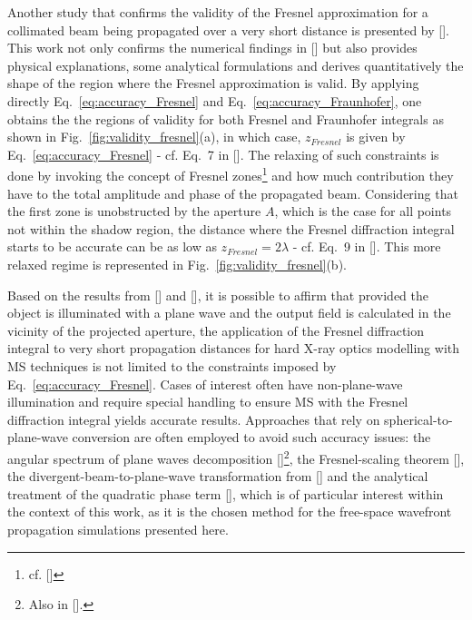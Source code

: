 \begin{refsection}
Another study that confirms the validity of the Fresnel approximation for a collimated beam being propagated over a very short distance is presented by [\cite{Rees87}]. This work not only confirms the numerical findings in [\cite{Southwell1981}] but also provides physical explanations, some analytical formulations and derives quantitatively the shape of the region where the Fresnel approximation is valid. By applying directly Eq.~\ref{eq:accuracy_Fresnel} and  Eq.~\ref{eq:accuracy_Fraunhofer}, one obtains the the regions of validity for both Fresnel and Fraunhofer integrals as shown in Fig.~\ref{fig:validity_fresnel}(a), in which case, $z_{Fresnel}$ is given by Eq.~\ref{eq:accuracy_Fresnel} - cf. Eq.~7 in [\cite{Rees87}]. The relaxing of such constraints is done by invoking the concept of Fresnel zones\footnote{cf. [\cite[\textit{§10.3.1}]{Hetch2017}]} and how much contribution they have to the total amplitude and phase of the propagated beam. Considering that the first zone is unobstructed by the aperture $A$, which is the case for all points not within the shadow region, the distance where the Fresnel diffraction integral starts to be accurate can be as low as $z_{Fresnel}=2\lambda$ - cf. Eq.~9 in [\cite{Rees87}]. This more relaxed regime is represented in Fig.~\ref{fig:validity_fresnel}(b).

Based on the results from [\cite{Southwell1981}] and [\cite{Rees87}], it is possible to affirm that provided the object is illuminated with a plane wave and the output field is calculated in the vicinity of the projected aperture, the application of the Fresnel diffraction integral to very short propagation distances for hard X-ray optics modelling with MS techniques is not limited to the constraints imposed by Eq.~\ref{eq:accuracy_Fresnel}. Cases of interest often have non-plane-wave illumination and require special handling to ensure MS with the Fresnel diffraction integral yields accurate results. Approaches that rely on spherical-to-plane-wave conversion are often employed to avoid such accuracy issues: the angular spectrum of plane waves decomposition [\cite[\textit{\S1.3}]{Paganin2006}]\footnote{Also in [\cite[\textit{\S3.10}~\&~\textit{\S4.2.4}]{Goodman2017}].}, the Fresnel-scaling theorem [\cite[\textit{\S A}]{Paganin2006}], the divergent-beam-to-plane-wave transformation from [\cite{Munro2019}] and the analytical treatment of the quadratic phase term [\cite{Chubar2019}], which is of particular interest within the context of this work, as it is the chosen method for the free-space wavefront propagation simulations presented here. 


\end{refsection}
